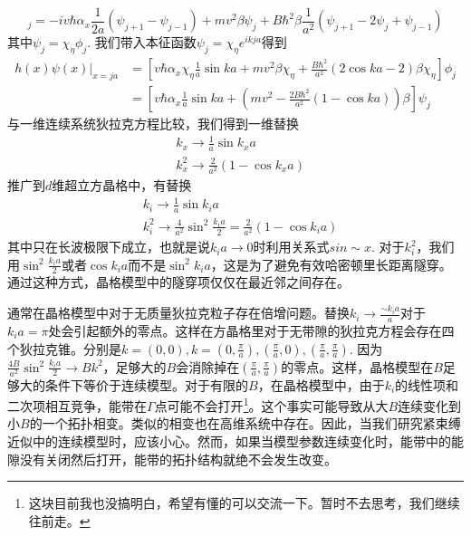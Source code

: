 \documentclass{article}
\numberwithin{equation}{subsection}
\begin{document}
\begin{equation}
    [h(x)\psi(x)]_{j}=-iv\hbar\alpha_x\frac{1}{2a}(\psi_{j+1}-\psi_{j-1})+mv^2\beta\psi_j+B\hbar^2\beta\frac{1}{a^2}(\psi_{j+1}-2\psi_{j}+\psi_{j-1})
\end{equation}
其中$\psi_j=\chi_\eta\phi_j$. 我们带入本征函数$\psi_j=\chi_\eta e^{ikja}$得到
\begin{equation}
    \begin{split}
        h(x)\psi(x)|_{x=ja}&=[v\hbar\alpha_x\chi_\eta\frac{1}{a}\sin ka+mv^2\beta\chi_\eta+\frac{B\hbar^2}{a^2}(2\cos ka-2)\beta\chi_\eta]\phi_j\\
        &=[v\hbar\alpha_x\frac{1}{a}\sin ka+(mv^2-\frac{2B\hbar^2}{a^2}(1-\cos ka))\beta]\psi_j
    \end{split}
\end{equation}
与一维连续系统狄拉克方程比较，我们得到一维替换
\begin{equation}
    \begin{split}
        &k_x\rightarrow\frac{1}{a}\sin k_xa\\
        &k_x^2\rightarrow\frac{2}{a^2}(1-\cos k_xa)
    \end{split}
\end{equation}
推广到$d$维超立方晶格中，有替换
\begin{equation}
    \begin{split}
        &k_i\rightarrow \frac{1}{a}\sin k_i a\\
        &k_i^2\rightarrow\frac{4}{a^2}\sin^2\frac{k_i a}{2}=\frac{2}{a^2}(1-\cos k_ia)
    \end{split}
\end{equation}
其中只在长波极限下成立，也就是说$k_ia\to0$时利用关系式$sin\sim x$. 对于$k_i^2$，我们用$\sin^2\frac{k_ia}{2}$或者$\cos k_ia$而不是$\sin^2k_ia$，这是为了避免有效哈密顿里长距离隧穿。通过这种方式，晶格模型中的隧穿项仅仅在最近邻之间存在。

通常在晶格模型中对于无质量狄拉克粒子存在倍增问题。替换$k_i\to\frac{\sim k_ia}{a}$对于$k_ia=\pi$处会引起额外的零点。这样在方晶格里对于无带隙的狄拉克方程会存在四个狄拉克锥。分别是$k=(0,0),k=(0,\frac{\pi}{a}),(\frac{\pi}{a},0),(\frac{\pi}{a},\frac{\pi}{a})$. 因为$\frac{4B}{a^2}\sin^2\frac{k_ia}{2}\to Bk^2$，足够大的$B$会消除掉在$(\frac{\pi}{a},\frac{\pi}{a})$的零点。这样，晶格模型在$B$足够大的条件下等价于连续模型。\textcolor[rgb]{1,0,0}{对于有限的$B$，在晶格模型中，由于$k_i$的线性项和二次项相互竞争，能带在$\Gamma$点可能不会打开}\footnote{这块目前我也没搞明白，希望有懂的可以交流一下。暂时不去思考，我们继续往前走。}。这个事实可能导致从大$B$连续变化到小$B$的一个拓扑相变。类似的相变也在高维系统中存在。因此，当我们研究紧束缚近似中的连续模型时，应该小心。然而，如果当模型参数连续变化时，能带中的能隙没有关闭然后打开，能带的拓扑结构就绝不会发生改变。
\end{document}
